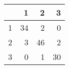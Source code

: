 \begin{tabular}{rrrr}
  \hline
 & 1 & 2 & 3 \\ 
  \hline
1 &  34 &   2 &   0 \\ 
  2 &   3 &  46 &   2 \\ 
  3 &   0 &   1 &  30 \\ 
   \hline
\end{tabular}
